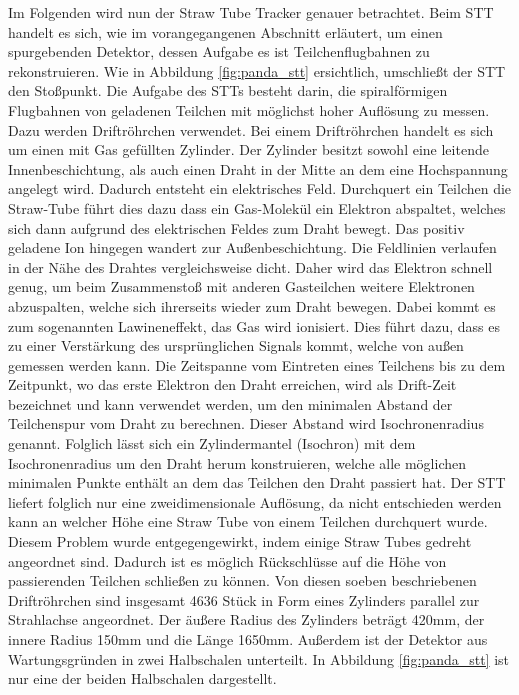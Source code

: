 Im Folgenden wird nun der Straw Tube Tracker genauer betrachtet. Beim STT handelt es sich, wie im vorangegangenen Abschnitt erläutert, um einen spurgebenden Detektor, dessen Aufgabe es ist Teilchenflugbahnen zu rekonstruieren. Wie in Abbildung \ref{fig:panda_stt} ersichtlich, umschließt der STT den Stoßpunkt. Die Aufgabe des STTs besteht darin, die spiralförmigen Flugbahnen von geladenen Teilchen mit möglichst hoher Auflösung zu messen. Dazu werden Driftröhrchen verwendet. Bei einem Driftröhrchen handelt es sich um einen mit Gas gefüllten Zylinder. Der Zylinder besitzt sowohl eine leitende Innenbeschichtung, als auch einen Draht in der Mitte an dem eine Hochspannung angelegt wird. Dadurch entsteht ein elektrisches Feld. Durchquert ein Teilchen die Straw-Tube führt dies dazu dass ein Gas-Molekül ein Elektron abspaltet, welches sich dann aufgrund des elektrischen Feldes zum Draht bewegt. Das positiv geladene Ion hingegen wandert zur Außenbeschichtung. Die Feldlinien verlaufen in der Nähe des Drahtes vergleichsweise dicht. Daher wird das Elektron schnell genug, um beim Zusammenstoß mit anderen Gasteilchen weitere Elektronen abzuspalten, welche sich ihrerseits wieder zum Draht bewegen. Dabei kommt es zum sogenannten Lawineneffekt, das Gas wird ionisiert. Dies führt dazu, dass es zu einer Verstärkung des ursprünglichen Signals kommt, welche von außen gemessen werden kann. Die Zeitspanne vom Eintreten eines Teilchens bis zu dem Zeitpunkt, wo das erste Elektron den Draht erreichen, wird als Drift-Zeit bezeichnet und kann verwendet werden, um den minimalen Abstand der Teilchenspur vom Draht zu berechnen. Dieser Abstand wird Isochronenradius genannt. Folglich lässt sich ein Zylindermantel (Isochron) mit dem Isochronenradius um den Draht herum konstruieren, welche alle möglichen minimalen Punkte enthält an dem das Teilchen den Draht passiert hat. Der STT liefert folglich nur eine zweidimensionale Auflösung, da nicht entschieden werden kann an welcher Höhe eine Straw Tube von einem Teilchen durchquert wurde. Diesem Problem wurde entgegengewirkt, indem einige Straw Tubes gedreht angeordnet sind. Dadurch ist es möglich Rückschlüsse auf die Höhe von passierenden Teilchen schließen zu können. Von diesen soeben beschriebenen Driftröhrchen sind insgesamt 4636 Stück in Form eines Zylinders parallel zur Strahlachse angeordnet. Der äußere Radius des Zylinders beträgt 420mm, der innere Radius 150mm und die Länge 1650mm. Außerdem ist der Detektor aus Wartungsgründen in zwei Halbschalen unterteilt. In Abbildung \ref{fig:panda_stt} ist nur eine der beiden Halbschalen dargestellt. 
\cite[S. 11-14]{MasterJette}

